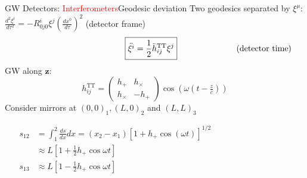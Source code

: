 \documentclass[xcolor=dvipsnames,t]{beamer}
\newcommand{\todo}[1]{\textcolor{orange}{\texttt{TODO: #1}}}
\newcommand{\red}[1]{\textcolor{red}{#1}}
\begin{document}
 \begin{frame}{GW Detectors: \red{Interferometers}}{Geodesic deviation}
    Two geodesics separated by $\xi^\mu$:
    $ \tfrac{d^2 \xi^i}{d\tau^2} = -R^i_{0j0} \xi^j\left(\tfrac{dx^0}{d\tau}\right)^2$ \hfill (detector frame)\\
    \vspace{-3mm}
    \[
    \hspace{4.5cm} \boxed{\ddot{\xi^i} = \frac{1}{2} \ddot{h}_{ij}^\text{TT} \xi^j} \hspace{2.5cm} \text{(detector time)}
    \]
    GW along $\mathbf{z}$: 
      \[
      h_{ij}^\text{TT} = \left(\begin{array}{cc}
				h_+ & h_\times \\
				h_\times & - h_+
				\end{array}\right) \cos\left(\omega\left( t-\tfrac{z}{c}\right)\right)
      \]
      Consider mirrors at $(0,0)_1, (L,0)_2$ and $(L,L)_3$
      \begin{small}
      \begin{align*}
	s_{12} &= \int_1^2 \tfrac{ds}{dx}dx = (x_2-x_1) \left[ 1 + h_+ \cos(\omega t)\right]^{1/2}\hspace{4cm} \\
				    & \approx L \left[ 1+\tfrac{1}{2} h_+ \cos\omega t \right] \\
      s_{13} &\approx L \left[ 1-\tfrac{1}{2} h_+ \cos\omega t \right]
      \end{align*}
      \end{small}
 \end{frame}
 
 
\end{document}
